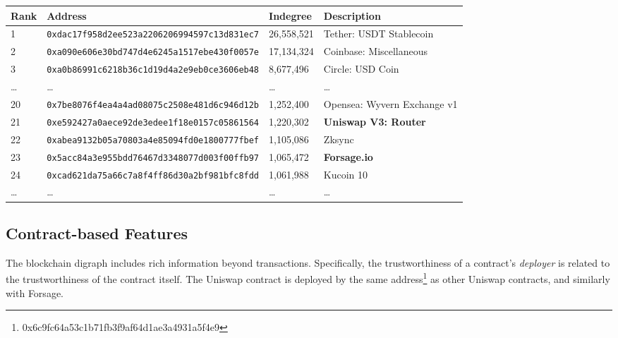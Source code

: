 \documentclass[a4paper]{article}
\begin{document}
\begin{table*}[t]
\centering

\bigskip

\begin{tabular}{|l|l|l|l|}
\hline
Rank & Address & Indegree & Description \\ \hline
1 & \texttt{0xdac17f958d2ee523a2206206994597c13d831ec7} & 26,558,521 & Tether: USDT Stablecoin\\
2 & \texttt{0xa090e606e30bd747d4e6245a1517ebe430f0057e} & 17,134,324 & Coinbase: Miscellaneous\\
3 & \texttt{0xa0b86991c6218b36c1d19d4a2e9eb0ce3606eb48} & 8,677,496 & Circle: USD Coin\\
\ldots & \ldots & \ldots & \ldots\\
20	& \texttt{0x7be8076f4ea4a4ad08075c2508e481d6c946d12b} & 1,252,400 & Opensea: Wyvern Exchange v1\\
21 & \texttt{0xe592427a0aece92de3edee1f18e0157c05861564} & 1,220,302 & \textbf{Uniswap V3: Router}\\
22	& \texttt{0xabea9132b05a70803a4e85094fd0e1800777fbef} & 1,105,086 & Zksync \\
23 & \texttt{0x5acc84a3e955bdd76467d3348077d003f00ffb97} & 1,065,472 & \textbf{Forsage.io}\\ 
24	& \texttt{0xcad621da75a66c7a8f4ff86d30a2bf981bfc8fdd} & 1,061,988 &   Kucoin 10\\
\ldots & \ldots & \ldots & \ldots\\

\hline
\end{tabular}
\caption{\label{indegree-table} Indegrees for popular Ethereum addresses, from Google BigQuery public Ethereum data, as of September 1, 2023.  Multiple transactions between addresses are treated as a single edge in the digraph.}
\bigskip

\end{table*}

\subsection{Contract-based Features}

The blockchain digraph includes rich information beyond transactions.  Specifically, the trustworthiness of a contract's {\it deployer} is related to the trustworthiness of the contract itself.  The Uniswap contract is deployed by the same address\footnote{0x6c9fc64a53c1b71fb3f9af64d1ae3a4931a5f4e9} as other Uniswap contracts, and similarly with Forsage.  
\end{document}
